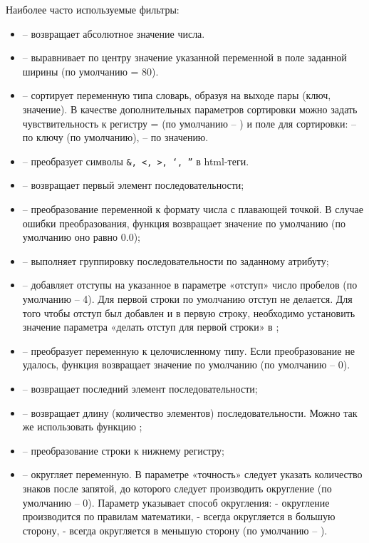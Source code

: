 Наиболее часто используемые фильтры:
\begin{itemize}
 \item {} – возвращает абсолютное значение числа.
 \item {} – выравнивает по центру значение указанной переменной в поле заданной ширины (по умолчанию = 80).
 \item {} – сортирует переменную типа словарь, образуя на выходе пары (ключ, значение). В качестве дополнительных параметров сортировки можно задать чувствительность к регистру =  (по умолчанию – ) и поле для сортировки:  – по ключу (по умолчанию),  – по значению.
 \item {} – преобразует символы \verb|&, <, >, ‘, ”| в html-теги.
 \item {} – возвращает первый элемент последовательности;
 \item {} – преобразование переменной к формату числа с плавающей точкой. В случае ошибки преобразования, функция возвращает значение по умолчанию (по умолчанию оно равно 0.0);
 \item {} – выполняет группировку последовательности по заданному атрибуту;
 \item {} – добавляет отступы на указанное в параметре «отступ» число пробелов (по умолчанию – 4). Для первой строки по умолчанию отступ не делается. Для того чтобы отступ был добавлен и в первую строку, необходимо установить значение параметра «делать отступ для первой строки» в ;
 \item {} – преобразует переменную к целочисленному типу. Если преобразование не удалось, функция возвращает значение по умолчанию (по умолчанию – 0).
 \item {} – возвращает последний элемент последовательности;
 \item {} – возвращает длину (количество элементов) последовательности. Можно так же использовать функцию ;
 \item {} – преобразование строки к нижнему регистру;
 \item {} – округляет переменную. В параметре «точность» следует указать количество знаков после запятой, до которого следует производить округление (по умолчанию – 0). Параметр  указывает способ округления:  - округление производится по правилам математики,  - всегда округляется в большую сторону,  - всегда округляется в меньшую сторону (по умолчанию – ).

\end{itemize}
